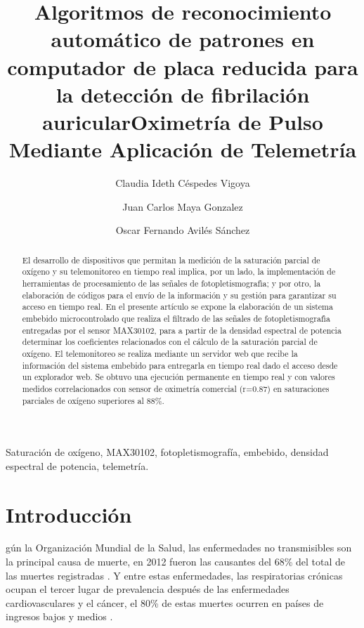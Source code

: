 \documentclass[journal]{IEEEtran}
\title{Algoritmos de reconocimiento automático de patrones en computador de placa reducida para la detección de fibrilación auricular}
\author{
Claudia Ideth Céspedes Vigoya \\ %
\and
Juan Carlos Maya Gonzalez
\and

Oscar Fernando Avilés Sánchez

}
\begin{document}
\title{Oximetría de Pulso Mediante Aplicación de Telemetría}
\maketitle


\begin{abstract}
	
El desarrollo de dispositivos que permitan la medición de la saturación parcial de oxígeno y su telemonitoreo en tiempo real implica, por un lado, la implementación de herramientas de procesamiento de las señales de fotopletismografìa; y por otro, la elaboración de códigos para el envío de la información y su gestión para garantizar su acceso en tiempo real. En el presente artículo se expone la elaboración de un sistema embebido microcontrolado que realiza el filtrado de las señales de fotopletismografìa entregadas por el sensor MAX30102, para a partir de la densidad espectral de potencia determinar los coeficientes relacionados con el cálculo de la saturación parcial de oxígeno. El telemonitoreo se realiza mediante un servidor web que recibe la información del sistema embebido para entregarla en tiempo real dado el acceso desde un explorador web. Se obtuvo una ejecución permanente en tiempo real y con valores medidos correlacionados con sensor de oximetría comercial (r=0.87) en saturaciones parciales de oxígeno superiores al 88\%. 


   
\end{abstract}
\IEEEpeerreviewmaketitle

\begin{IEEEkeywords}
	Saturación de oxígeno, MAX30102, fotopletismografía, embebido, densidad espectral de potencia, telemetría.
\end{IEEEkeywords}


\section{Introducción}



gún la Organización Mundial de la Salud, las enfermedades no transmisibles son la principal causa de muerte, en 2012 fueron las causantes del 68\% del total de las muertes registradas \cite{A_OMS_informe}. Y entre estas enfermedades, las respiratorias crónicas ocupan el tercer lugar de prevalencia después de las enfermedades cardiovasculares y el cáncer, el 80\% de estas muertes ocurren en países de ingresos bajos y medios  %
\cite{A_OMS_prevencion}.
\end{document}

